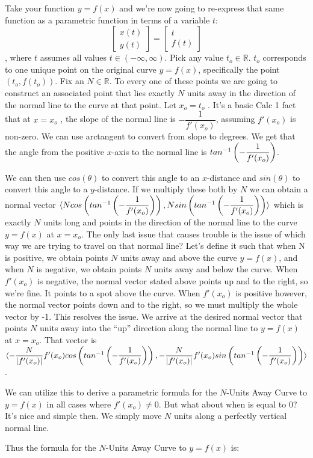 Take your function $y = f(x)$ and we're now going to re-express that same function as a parametric function in terms of a variable $t$: \begin{equation*}
  \begin{bmatrix}
    x(t) \\
    y(t)
  \end{bmatrix} =
  \begin{bmatrix}
    t \\
    f(t)
  \end{bmatrix}
\end{equation*}, where $t$ assumes all values $t \in (- \infty, \infty)$. Pick any value $t_o \in \mathbb{R}$. $t_o$ corresponds to one unique point on the original curve $y = f(x)$, specifically the point $(t_o , f(t_o ))$. Fix an $N \in \mathbb{R}$. To every one of these points we are going to construct an associated point that lies exactly $N$ units away in the direction of the normal line to the curve at that point. Let $x_o = t_o$ . It’s a basic Calc 1 fact that at $x = x_o$ , the slope of the normal line is $-\dfrac{1}{f'(x_o)}$, assuming $f'(x_o)$ is non-zero. We can use arctangent to convert from slope to degrees. We get that the angle from the positive $x$-axis to the normal line is $tan^{-1} \left( -\dfrac{1}{f'(x_o)} \right)$.

We can then use $cos(\theta)$ to convert this angle to an $x$-distance and $sin(\theta)$ to convert this angle to a $y$-distance. If we multiply these both by $N$ we can obtain a normal vector $\langle N cos \left( tan^{-1} \left( -\dfrac{1}{f'(x_o)} \right) \right), \allowbreak N sin \left( tan^{-1} \left( -\dfrac{1}{f'(x_o)} \right) \right) \rangle $ which is exactly $N$ units long and points in the direction of the normal line to the curve $y = f(x)$ at $x = x_o$. The only last issue that causes trouble is the issue of which way we are trying to travel on that normal line? Let’s define it such that when N is positive, we obtain points $N$ units away and above the curve $y = f(x)$, and when $N$ is negative, we obtain points $N$ units away and below the curve. When $f'(x_o)$ is negative, the normal vector stated above points up and to the right, so we’re fine. It points to a spot above the curve. When $f'(x_o)$ is positive however, the normal vector points down and to the right, so we must multiply the whole vector by -1. This resolves the issue. We arrive at the desired normal vector that points $N$ units away into the ``up'' direction along the normal line to $y = f(x)$ at $x = x_o$. That vector is $\langle - \dfrac{N}{|f'(x_o)|} f'(x_o) cos \left( tan^{-1} \left( -\dfrac{1}{f'(x_o)} \right) \right), - \dfrac{N}{|f'(x_o)|} f'(x_o) sin \left( tan^{-1} \left( -\dfrac{1}{f'(x_o)} \right) \right) \rangle$.

We can utilize this to derive a parametric formula for the $N$-Units Away Curve to $y = f(x)$
in all cases where $f'(x_o) \neq 0$. But what about when is equal to 0? It’s nice and simple then.
We simply move $N$ units along a perfectly vertical normal line.

Thus the formula for the $N$-Units Away Curve to $y = f(x)$ is:

\firstFormula
